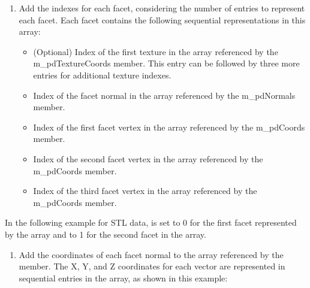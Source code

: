 \documentclass[letterpaper,12pt,english,openany,oneside]{sphinxmanual}
\begin{document}
\begin{enumerate}
%
\setcounter{enumi}{1}
\item {} 
Add the indexes for each facet, considering the number of entries to represent each facet. Each facet contains the following sequential representations in this array:
\begin{itemize}
\item {} 
(Optional) Index of the first texture in the array referenced by the m\_pdTextureCoords member. This entry can be followed by three more entries for additional texture indexes.

\item {} 
Index of the facet normal in the array referenced by the m\_pdNormals member.

\item {} 
Index of the first facet vertex in the array referenced by the m\_pdCoords member.

\item {} 
Index of the second facet vertex in the array referenced by the m\_pdCoords member.

\item {} 
Index of the third facet vertex in the array referenced by the m\_pdCoords member.

\end{itemize}

\end{enumerate}

In the following example for STL data,  is set to 0 for the first facet represented by the array and to 1 for the second facet in the array.

\begin{sphinxVerbatim}[commandchars=\\\{\}]
\PYG{p}{[}  \PYG{p}{]}  
\PYG{p}{[}    \PYG{p}{]}  
\PYG{p}{[}  \PYG{p}{]}    
\PYG{p}{[}  \PYG{p}{]}    
\end{sphinxVerbatim}
\begin{enumerate}
%
\setcounter{enumi}{2}
\item {} 
Add the coordinates of each facet normal to the array referenced by the  member. The X, Y, and Z coordinates for each vector are represented in sequential entries in the array, as shown in this example:

\end{enumerate}
\end{document}
